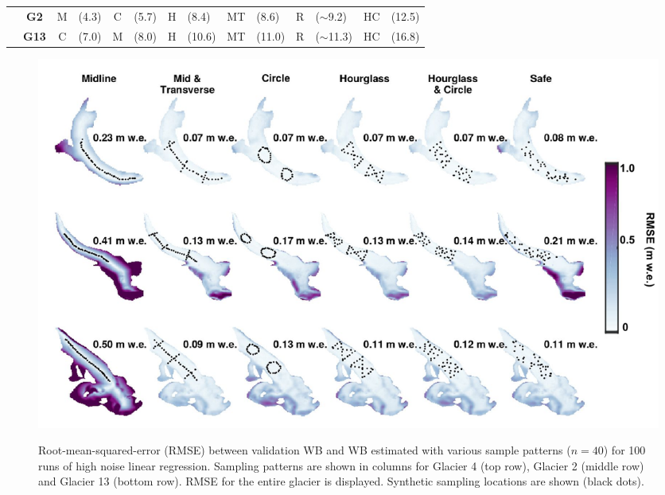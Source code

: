 \documentclass{article}
\begin{document}
\begin{table}[]
\begin{tabular}{lcclclclclclcl}
 & \textbf{G2} & \textcolor{M}{M} & (4.3) & \textcolor{C}{C} & (5.7) & \textcolor{H}{H} & (8.4) & \textcolor{MT}{MT} & (8.6) & \textcolor{R}{R} & ($\sim$9.2) & \textcolor{HC}{HC} & (12.5) \\
 & \textbf{G13} & \textcolor{C}{C} & (7.0) & \textcolor{M}{M} & (8.0) & \textcolor{H}{H} & (10.6) & \textcolor{MT}{MT} & (11.0) & \textcolor{R}{R} & ($\sim$11.3) & \textcolor{HC}{HC} & (16.8)
\end{tabular}
\end{table}

\begin{figure}
	\centering
	\includegraphics[width =\textwidth]{SynObsRMSEmap.pdf}\\
	\caption{Root-mean-squared-error (RMSE) between validation WB and WB estimated with various sample patterns ($n=40$) for 100 runs of high noise linear regression. Sampling patterns are shown in columns for Glacier 4 (top row), Glacier 2 (middle row) and Glacier 13 (bottom row). RMSE for the entire glacier is displayed. Synthetic sampling locations are shown (black dots).}
	\label{fig:SynObsRMSEmap}
\end{figure}
\end{document}

